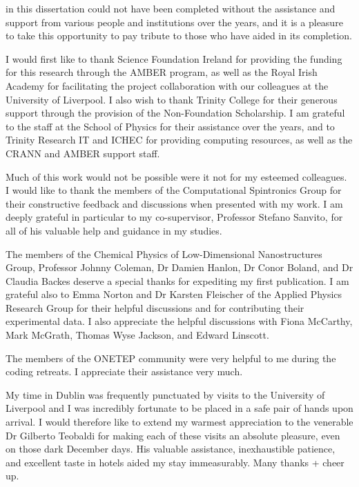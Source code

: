 in this dissertation 
could not have been completed 
without the assistance and support from  
various people and institutions over the years, 
and it is a pleasure to take this opportunity 
to pay tribute to those who have aided in its completion.


I would first like to thank 
Science Foundation Ireland 
for providing the funding for this research   
through the {\sc AMBER} program, 
as well as the Royal Irish Academy 
for facilitating the project collaboration with 
our colleagues at 
the University of Liverpool.
%
I also wish to thank 
Trinity College for their generous support 
through the provision of 
the Non-Foundation Scholarship.
%
I am grateful to the staff at the School of Physics 
for their assistance over the years, 
and to Trinity Research IT and {\sc ICHEC} 
for providing computing resources, 
as well as the 
{\sc CRANN} and {\sc AMBER} support staff.


Much of this work would not be possible 
were it not for my esteemed colleagues.
%
I would like to thank the members of the 
Computational Spintronics Group 
for their constructive feedback 
and discussions when presented with my work.
% 
I am deeply grateful in particular to 
my co-supervisor, 
Professor Stefano Sanvito, 
for all of his valuable help 
and guidance in my studies.

The members of the 
Chemical Physics of Low-Dimensional 
Nanostructures Group, 
Professor Johnny Coleman, 
Dr Damien Hanlon, 
Dr Conor Boland, 
and Dr Claudia Backes 
deserve a special thanks 
for expediting my first publication.
%
I am grateful also to 
Emma Norton and Dr Karsten Fleischer 
of the Applied Physics Research Group
for their helpful discussions and 
for contributing their experimental data.
%
I also appreciate the helpful discussions with 
Fiona McCarthy, Mark McGrath,  
Thomas Wyse Jackson, 
and Edward Linscott.


The members of the {\sc ONETEP} community 
were very helpful to me during the coding retreats. 
I appreciate their assistance very much.

My time in Dublin 
was frequently punctuated by 
visits to the University of Liverpool 
and I was incredibly fortunate to be placed 
in a safe pair of hands upon arrival.
%
I would therefore like to extend 
my warmest appreciation   
to the venerable Dr Gilberto Teobaldi 
for making each of these visits 
an absolute pleasure, 
even on those dark December days.
%
His valuable assistance, 
inexhaustible patience, 
and excellent taste in hotels  
aided my stay immeasurably.
%
Many thanks + cheer up.


